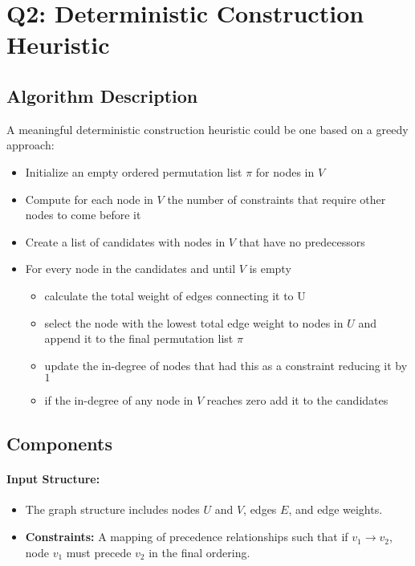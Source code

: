 \documentclass{article}
\begin{document}
\section*{Q2: Deterministic Construction Heuristic}

\subsection*{Algorithm Description}

A meaningful deterministic construction heuristic could be one based on a greedy approach:
\begin{itemize}
    \item Initialize an empty ordered permutation list $\pi$ for nodes in $V$
    \item Compute for each node in $V$ the number of constraints that require other nodes to come before it
    \item Create a list of candidates with nodes in $V$ that have no predecessors
    \item For every node in the candidates and until $V$ is empty
    \begin{itemize}
        \item calculate the total weight of edges connecting it to U
        \item select the node with the lowest total edge weight to nodes in $U$ and append it to the final permutation list $\pi$
        \item  update the in-degree of nodes that had this as a constraint reducing it by $1$
        \item if the in-degree of any node in $V$ reaches zero add it to the candidates
        
    \end{itemize}
\end{itemize}

\subsection*{Components}

\paragraph{Input Structure:}
\begin{itemize}
    \item The graph structure includes nodes \( U \) and \( V \), edges \( E \), and edge weights.
    \item \textbf{Constraints:} A mapping of precedence relationships such that if \( v_1 \to v_2 \), node \( v_1 \) must precede \( v_2 \) in the final ordering.
\end{itemize}
\end{document}
